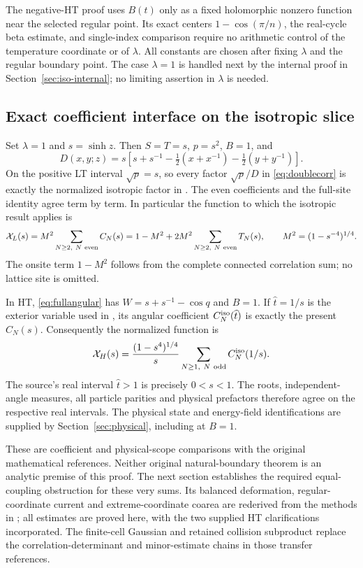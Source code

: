\documentclass[11pt]{article}
\numberwithin{equation}{section}
\theoremstyle{definition}
\begin{document}
The negative-HT proof uses $B(t)$ only as a fixed holomorphic nonzero
function near the selected regular point. Its exact centers
$1-\cos(\pi/n)$, the real-cycle beta estimate, and single-index
comparison require no arithmetic control of the temperature coordinate
or of $\lambda$. All constants are chosen after fixing $\lambda$ and
the regular boundary point. The case $\lambda=1$ is handled next by
the internal proof in Section~\ref{sec:iso-internal}; no limiting
assertion in $\lambda$ is needed.

\subsection{Exact coefficient interface on the isotropic slice}
Set $\lambda=1$ and $s=\sinh z$. Then $S=T=s$, $p=s^2$, $B=1$, and
\[
 D(x,y;z)=s\left[s+s^{-1}
                  -\tfrac12(x+x^{-1})-\tfrac12(y+y^{-1})\right].
\]
On the positive LT interval $\sqrt p=s$, so every factor
$\sqrt p/D$ in \eqref{eq:doublecorr} is exactly the normalized
isotropic factor in \cite[Section 2 and Appendix F]{LTsource}.
The even coefficients and the full-site identity agree term by term.
In particular the function to which the isotropic result applies is
\begin{equation}\label{eq:iso-LT-interface}
 \mathcal X_L(s)=M^2\sum_{N\ge2,\ N\ {\rm even}}C_N(s)
 =1-M^2+2M^2\sum_{N\ge2,\ N\ {\rm even}}T_N(s),
 \qquad M^2=(1-s^{-4})^{1/4}.
\end{equation}
The onsite term $1-M^2$ follows from the complete connected correlation
sum; no lattice site is omitted.

In HT, \eqref{eq:fullangular} has $W=s+s^{-1}-\cos q$ and
$B=1$. If $\widehat t=1/s$ is the exterior variable used in
\cite[Section 2]{HTsource}, its angular coefficient
$C_N^{\rm iso}(\widehat t)$ is exactly the present $C_N(s)$.
Consequently the normalized function is
\begin{equation}\label{eq:iso-HT-interface}
 \mathcal X_H(s)=\frac{(1-s^4)^{1/4}}s
       \sum_{N\ge1,\ N\ {\rm odd}}C_N^{\rm iso}(1/s).
\end{equation}
The source's real interval $\widehat t>1$ is precisely $0<s<1$.
The roots, independent-angle measures, all particle parities and physical
prefactors therefore agree on the respective real intervals. The physical
state and energy-field identifications are supplied by
Section~\ref{sec:physical}, including at $B=1$.

These are coefficient and physical-scope comparisons with the original
mathematical references.  Neither original natural-boundary theorem is
an analytic premise of this proof.  The next section establishes the
required equal-coupling obstruction for these very sums.  Its balanced
deformation, regular-coordinate current and extreme-coordinate coarea
are rederived from the methods in \cite{LTmethod,HTmethod}; all
estimates are proved here, with the two supplied HT clarifications
incorporated.  The finite-cell Gaussian and retained collision
subproduct replace the correlation-determinant and minor-estimate
chains in those transfer references.
\end{document}
